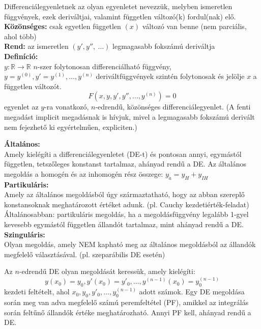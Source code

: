 \documentclass[11pt,a4paper]{article}
\begin{document}
    \begin{tcolorbox}[colback=red!5!white,colframe=red!60!black,title= 1. Közönséges n-edrendű differenciálegyenlet]
        Differenciálegyenletnek az olyan egyenletet nevezzük, melyben ismeretlen függvények, ezek deriváltjai, valamint független változó(k) fordul(nak) elő. \\
        \textbf{Közönséges:} csak egyetlen független $(x)$ változó van benne (nem parciális, ahol több) \\
        \textbf{Rend:} az ismeretlen $(y', y'',\ \dots)$ legmagasabb fokszámú deriváltja \\
        \textbf{Definíció:} \\
        $y:\mathbb{R} \rightarrow \mathbb{R}$ $n$-szer folytonosan differenciálható függvény, $y = y^{(0)}, y' = y^{(1)}, \dots, y^{(n)}$ deriváltfüggvények szintén folytonosak és jelölje $x$ a független változót.
        $$F(x,y,y',y'',\dots,y^{(n)}) = 0$$
        egyenlet az $y$-ra vonatkozó, $n$-edrendű, közönséges differenciálegyenlet. (A fenti megadást implicit megadásnak is hívjuk, mivel a legmagasabb fokszámú derivált nem fejezhető ki egyértelműen, expliciten.)
    \end{tcolorbox}

    \begin{tcolorbox}[colback=red!5!white,colframe=red!60!black,title= 2. Differenciálegyenlet megoldásának típusai]
        \textbf{Általános:} \\
        Amely kielégíti a differenciálegyenletet (DE-t) és pontosan annyi, egymástól független, tetszőleges konstanst tartalmaz, ahányad rendű a DE. Az általános megoldás a homogén és az inhomogén rész összege: $y_{\acute{a} } = y_{H} + y_{IH}$ \\
        \textbf{Partikuláris:} \\
        Amely az általános megoldásból úgy származtatható, hogy az abban szereplő konstansoknak meghatározott értéket adunk. (pl. Cauchy kezdetiérték-feladat) Általánosabban: partikuláris megoldás, ha a megoldásfüggvény legalább 1-gyel kevesebb egymástól független állandót tartalmaz, mint ahányad rendű a DE. \\
        \textbf{Szinguláris:} \\
        Olyan megoldás, amely NEM kapható meg az általános megoldásból az állandók megfelelő választásával. (pl. szeparábilis DE esetén)
    \end{tcolorbox}

    \begin{tcolorbox}[colback=red!5!white,colframe=red!60!black,title= 3. Cauchy-feladat]
        Az $n$-edrendű DE olyan megoldását keressük, amely kielégíti:
        $$y(x_{0}) = y_{0}, y'(x_{0}) = y'_0,\dots, y^{(n-1)}(x_{0}) = y^{(n-1)}_0$$
        kezdeti feltételt, ahol $x_{0}, y_{0}, y'_{0},\dots, y^{(n-1)}_{0}$ adott számok. Egy DE megoldása során meg van adva megfelelő számú peremfeltétel (PF), amikkel az integrálás során feltűnő állandók értéke meghatározható. Annyi PF kell, ahányad rendű a DE.
    \end{tcolorbox}
\end{document}
